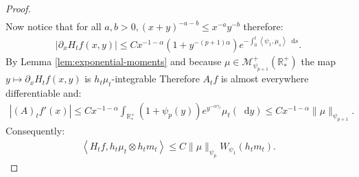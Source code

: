 \documentclass[11pt,a4paper]{article}
\newcommand{\RRP}{\mathbb{R}^+_*}
\newcommand{\MC}{\mathcal{M}}
\newcommand{\A}{(A)}
\newcommand{\brac}[1]{\left\langle#1\right\rangle}
\newcommand{\dd}{\mathop{}\!\mathrm{d}}
\begin{document}
\begin{proof}
\begin{multline*}
    \end{multline*}
    Now notice that for all $a,b > 0, (x+y)^{-a - b} \leq x^{-a}y^{-b}$ therefore:
    \begin{align*}
        \left|\partial_x H_tf(x,y) \right| \leq C x^{-1-\alpha} (1 + y^{-(p+1)\alpha})e^{-\int_0^t \brac{\psi_1,\mu_s}\dd s}.
    \end{align*}
    By Lemma \ref{lem:exponential-moments} and because $\mu \in \MC^+_{\psi_{p+1}}(\RRP)$ the map $y \mapsto \partial_x H_tf(x,y)$ is $h_t \mu_t$-integrable Therefore $A_tf$ is almost everywhere differentiable and: 
    \begin{align*}
        \left|\A_tf'(x) \right| \leq  C x^{-1-\alpha}\int_{\RRP} (1 + \psi_{p}(y)) e^{y^{-\alpha \gamma_t }}\mu_t(\dd y) \leq C x^{-1-\alpha}\| \mu\|_{\psi_{p+1}}.
    \end{align*}
    Consequently:
    \begin{align*}
        \brac{H_tf,h_t\mu_t \otimes h_t m_t} \leq C\|\mu\|_{\psi_{p}} W_{\psi_1}(h_tm_t).
    \end{align*} 


\end{proof}
\end{document}
